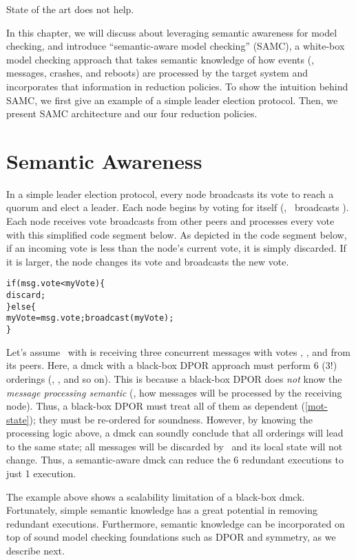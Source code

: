 State of the art does not help.

In this chapter, we will discuss about leveraging semantic awareness for model
checking, and introduce ``semantic-aware model checking'' (SAMC), a white-box
model checking approach that takes semantic knowledge of how events (\eg,
messages, crashes, and reboots) are processed by the target system and
incorporates that information in reduction policies.  To show the intuition
behind SAMC, we first give an example of  a simple leader election protocol.
Then, we present SAMC architecture and our four reduction policies.

\section{Semantic Awareness}

In a simple leader election protocol, every node broadcasts its vote to reach a
quorum and elect a leader.  Each node begins by voting for itself (\eg, \ntwo\
broadcasts ).  Each node receives vote broadcasts from other peers
and processes every vote with this simplified code segment below.  As depicted
in the code segment below, if an incoming vote is less than the node's current
vote, it is simply discarded.  If it is larger, the node changes its vote and
broadcasts the new vote.

\begin{alltt}
if (msg.vote < myVote) \{
  discard;
\} else \{
  myVote = msg.vote; broadcast(myVote);
\}
\end{alltt}

Let's assume \nfour\ with  is receiving three concurrent messages
with votes \ts{1}, \ts{2}, and \ts{3} from its peers.  Here, a dmck with a
black-box DPOR approach must perform 6 (3!) orderings (\ts{123}, \ts{132}, and
so on).  This is because a black-box DPOR does {\em not} know the {\em message
processing semantic} (\ie, how messages will be processed by the receiving
node).  Thus, a black-box DPOR must treat all of them as dependent
(\sec\ref{mot-state}); they must be re-ordered for soundness.  However, by
knowing the processing logic above, a dmck can soundly conclude that all
orderings will lead to the same state; all messages will be discarded by \nfour\
and its local state will not change.  Thus, a semantic-aware dmck can reduce the
6 redundant executions to just 1 execution.

The example above shows a scalability limitation of a black-box dmck.
Fortunately, simple semantic knowledge has a great potential in removing
redundant executions.  Furthermore, semantic knowledge can be incorporated on
top of sound model checking foundations such as DPOR and symmetry, as we
describe next.
